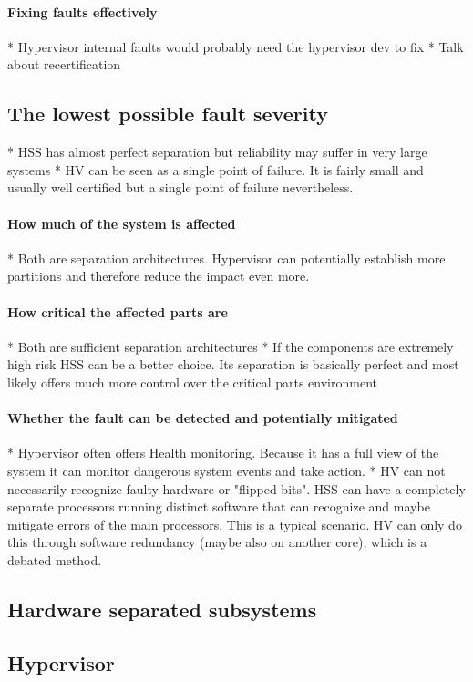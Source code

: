 \paragraph{Fixing faults effectively}
* Hypervisor internal faults would probably need the hypervisor dev to fix
* Talk about recertification
\subsection{The lowest possible fault severity}
* HSS has almost perfect separation but reliability may suffer in very large systems
* HV can be seen as a single point of failure. It is fairly small and usually well certified but a single point of failure nevertheless. 
\paragraph{How much of the system is affected}
* Both are separation architectures. Hypervisor can potentially establish more partitions and therefore reduce the impact even more.
\paragraph{How critical the affected parts are}
* Both are sufficient separation architectures
* If the components are extremely high risk HSS can be a better choice. Its separation is basically perfect and most likely offers much more control over the critical parts environment
\paragraph{Whether the fault can be detected and potentially mitigated}
* Hypervisor often offers Health monitoring. Because it has a full view of the system it can monitor dangerous system events and take action.
* HV can not necessarily recognize faulty hardware or "flipped bits". HSS can have a completely separate processors running distinct software that can recognize and maybe mitigate errors of the main processors. This is a typical scenario. HV can only do this through software redundancy (maybe also on another core), which is a debated method.

\subsection{Hardware separated subsystems}
\subsection{Hypervisor}

